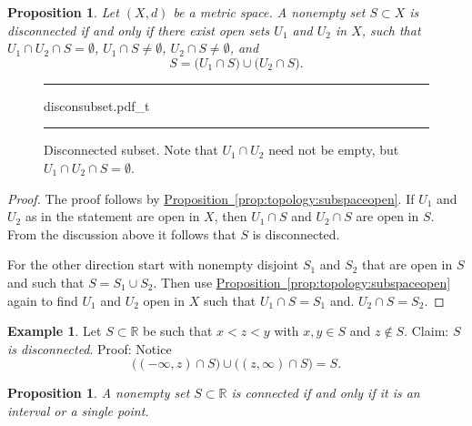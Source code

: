 \documentclass[12pt,openany]{book}
\newcommand{\R}{{\mathbb{R}}}
\theoremstyle{plain}
\newtheorem{prop}[thm]{Proposition}
\theoremstyle{remark}
\theoremstyle{definition}
\newenvironment{myfig}{%
\begin{figure}[h!t]
\noindent\rule{\textwidth}{0.4pt}\vspace{12pt}\par\centering}%
{\par\noindent\rule{\textwidth}{0.4pt}
\end{figure}}
\theoremstyle{exercise}
\theoremstyle{example}
\newtheorem{example}[thm]{Example}
\newcommand{\propref}[1]{\hyperref[#1]{Proposition~\ref*{#1}}}
\begin{document}
\begin{prop}
Let $(X,d)$ be a metric space.
A nonempty set $S \subset X$ is disconnected if and only if
there exist open sets $U_1$ and
$U_2$ in $X$, such that $U_1 \cap U_2 \cap S = \emptyset$,
$U_1 \cap S \not= \emptyset$,
$U_2 \cap S \not= \emptyset$, and
\begin{equation*}
S = 
\bigl( U_1 \cap S \bigr)
\cup
\bigl( U_2 \cap S \bigr) .
\end{equation*}
\end{prop}

\begin{myfig}
{disconsubset.pdf_t}
\caption{Disconnected subset.  Note that $U_1 \cap U_2$ need
not be empty, but $U_1 \cap U_2 \cap S = \emptyset$.\label{fig:disconsubset}}
\end{myfig}


\begin{proof}
The proof follows by \propref{prop:topology:subspaceopen}.
If $U_1$ and $U_2$ as in the statement are open in $X$,
then $U_1 \cap S$ and $U_2 \cap S$ are open in $S$.
From the discussion above it follows that $S$ is disconnected.

For the other direction start with nonempty disjoint $S_1$ and $S_2$ that are
open in $S$ and such that $S = S_1 \cup S_2$.  Then use
\propref{prop:topology:subspaceopen} again to find $U_1$ and $U_2$
open in $X$ such that $U_1 \cap S = S_1$ and.
$U_2 \cap S = S_2$.
\end{proof}

\begin{example}
Let $S \subset \R$ be such that $x < z < y$ with $x,y \in S$
and $z \notin S$.  Claim: \emph{$S$ is disconnected}.  Proof:  Notice
\begin{equation*}
\bigl( (-\infty,z) \cap S \bigr)
\cup
\bigl( (z,\infty) \cap S \bigr)
= S .
\end{equation*}
\end{example}

\begin{prop}
A nonempty set $S \subset \R$ is connected if and only if it is
an interval or a single point.
\end{prop}
\end{document}
